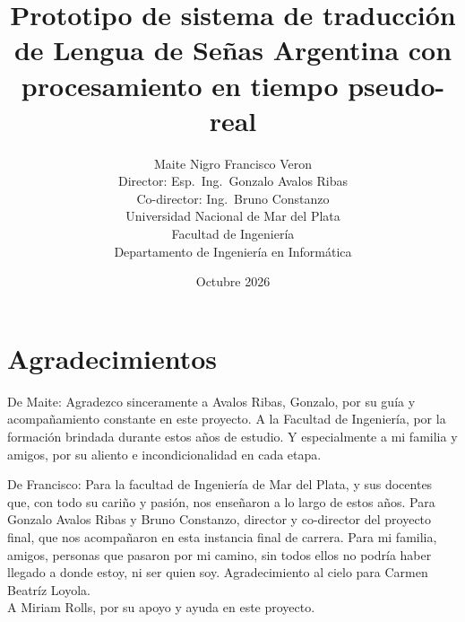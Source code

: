 \documentclass[12pt,a4paper]{report}
\title{\textbf{Prototipo de sistema de traducción de Lengua de Señas Argentina con procesamiento en tiempo pseudo-real}}
\author{
    Maite Nigro \quad Francisco Veron \\[0.5cm]
    \small Director: Esp.\ Ing.\ Gonzalo Avalos Ribas \\[0.2cm]
    \small Co-director: Ing.\ Bruno Constanzo \\[0.8cm]
    \small Universidad Nacional de Mar del Plata \\
    \small Facultad de Ingeniería \\
    \small Departamento de Ingeniería en Informática
}
\date{Octubre 2026}
\begin{document}
\maketitle

\chapter*{Agradecimientos}
De Maite: Agradezco sinceramente a Avalos Ribas, Gonzalo, por su guía y acompañamiento constante en este proyecto.
A la Facultad de Ingeniería, por la formación brindada durante estos años de estudio.
Y especialmente a mi familia y amigos, por su aliento e incondicionalidad en cada etapa.

De Francisco: Para la facultad de Ingeniería de Mar del Plata, y sus docentes que, con todo su cariño y pasión, nos enseñaron a lo largo de estos años. Para Gonzalo Avalos Ribas y Bruno Constanzo, director y co-director del proyecto final, que nos acompañaron en esta instancia final de carrera. Para mi familia, amigos, personas que pasaron por mi camino, sin todos ellos no podría haber llegado a donde estoy, ni ser quien soy. Agradecimiento al cielo para Carmen Beatríz Loyola.\\
A Miriam Rolls, por su apoyo y ayuda en este proyecto.

\tableofcontents













\printbibliography[heading=bibintoc, title={Bibliografía}]

\appendix



\end{document}
